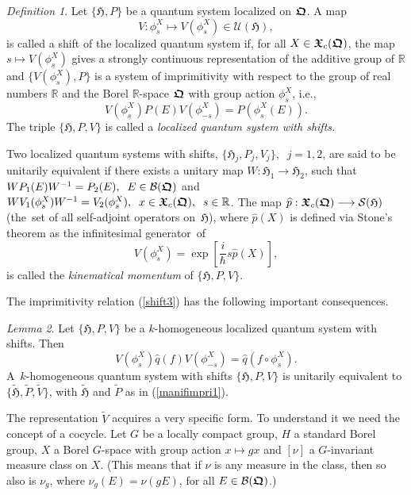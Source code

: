 \documentclass[11pt]{amsart}
\numberwithin{equation}{section}
\theoremstyle{remark}
\newcommand\HH{\mathfrak H}
\newtheorem{defi}{Definition}[section]
\newtheorem{lem}[defi]{Lemma}
\newcommand{\bedefin}{\begin{defi}}
\newcommand{\belem}{\begin{lem}}
\newcommand{\enlem}{\end{lem}}
\newcommand{\be}{\begin{equation}}
\newcommand{\en}{\end{equation}}
\newcommand{\htil}{\widetilde{\mathfrak H}}
\newcommand{\bfrakQ}{\mbox{\boldmath $\mathfrak Q$}}
\newcommand{\bfrakX}{\mbox{\boldmath $\mathfrak X$}}
\begin{document}
\bedefin
  Let $\{\HH ,P\}$ be a quantum system localized on $\bfrakQ$. A map
\be
   V: \phi^X_s \longmapsto  V( \phi^X_s ) \in {\mathcal U}(\HH ),
\label{shift2}
\en
is called a shift of the localized quantum system if, for all
$X \in {\bfrakX}_c (\bfrakQ )$, the map $s \longmapsto V( \phi^X_s )$ gives a
strongly continuous representation of the additive group of $\mathbb R$ and
$\{V( \phi^X_s ) , P \}$ is a system of imprimitivity with respect to the group
of real numbers $\mathbb R$ and the Borel $\mathbb R$-space $\bfrakQ$ with
group action $\phi^X_s$, i.e.,
\be
   V( \phi^X_s )P(E)V( \phi^X_{-s} ) = P(\phi^X_s (E)).
\label{shift3}
\en
The triple $\{ \HH , P , V \}$ is called a {\sl localized quantum system with
shifts.}  \end{defi}

Two localized quantum systems with shifts, $\{ \HH_j , P_j , V_j \}, \;\;
j=1,2$, are said to be unitarily equivalent if there exists a unitary map $W:
\HH_1 \longrightarrow \HH_2$, such that $W P_1 (E)W^{-1} = P_2 (E), \;\; E \in
{\mathcal B}(\bfrakQ )$ and $WV_1(\phi^X_s )W^{-1} = V_2(\phi^X_s ), \;\; x \in
{\bfrakX}_c (\bfrakQ ), \;\; s \in \mathbb R$. The map $\widehat{p} :
{\bfrakX}_c (\bfrakQ ) \longrightarrow  {\mathcal S}(\HH )$
(the~set of all self-adjoint operators on~$\HH$), where $\widehat{p}(X)$ is
defined via Stone's theorem as the infinitesimal generator~of
\be
     V( \phi^X_s ) = \exp [\frac i\hbar s\widehat{p}(X) ],
\label{kinmom}
\en
is called the {\em kinematical momentum} of $\{ \HH , P, V\}$.

The imprimitivity relation (\ref{shift3}) has the following important
consequences.

\belem
Let $\{ \HH , P , V \}$ be a $k$-homogeneous localized quantum system with
shifts. Then
\be
 V( \phi^X_s )\widehat{q}(f)V( \phi^X_{-s} ) = \widehat{q}(f\circ\phi^X_s).
\label{shift4}
\en
A~$k$-homogeneous quantum system with shifts $\{ \HH , P , V \}$ is unitarily
equivalent to $\{ \htil , \widetilde{P} , \widetilde{V} \}$, with $\htil$ and
$\widetilde{P}$ as in (\ref{manifimpri1}).
\enlem

The representation $\widetilde{V}$ acquires a very specific form. To understand
it we need the concept of a cocycle. Let $G$ be a locally compact group, $H$ a
standard Borel group, $X$ a Borel $G$-space with group action $x\longmapsto gx$
and $[\nu]$ a $G$-invariant measure class on $X$. (This means that if $\nu$ is
any measure in the class, then so also is $\nu_g$, where $\nu_g(E)=\nu(gE)$,
for all $E \in {\mathcal B}(\bfrakQ )$.)
\end{document}

